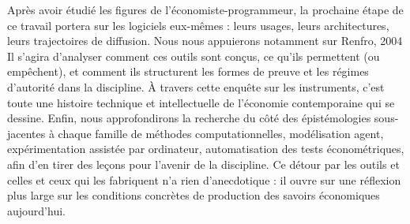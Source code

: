 Après avoir étudié les figures de l’économiste-programmeur, la prochaine étape de ce travail portera sur les logiciels eux-mêmes : leurs usages, leurs architectures, leurs trajectoires de diffusion. Nous nous appuierons notamment sur Renfro, 2004\cite{renfroCompendiumExistingEconometric2004} Il s’agira d’analyser comment ces outils sont conçus, ce qu’ils permettent (ou empêchent), et comment ils structurent les formes de preuve et les régimes d’autorité dans la discipline. À travers cette enquête sur les instruments, c’est toute une histoire technique et intellectuelle de l’économie contemporaine qui se dessine.
Enfin, nous approfondirons la recherche du côté des épistémologies sous-jacentes à chaque famille de méthodes computationnelles, modélisation agent, expérimentation assistée par ordinateur, automatisation des tests économétriques, afin d’en tirer des leçons pour l’avenir de la discipline. Ce détour par les outils et celles et ceux qui les fabriquent n’a rien d’anecdotique : il ouvre sur une réflexion plus large sur les conditions concrètes de production des savoirs économiques aujourd’hui.
